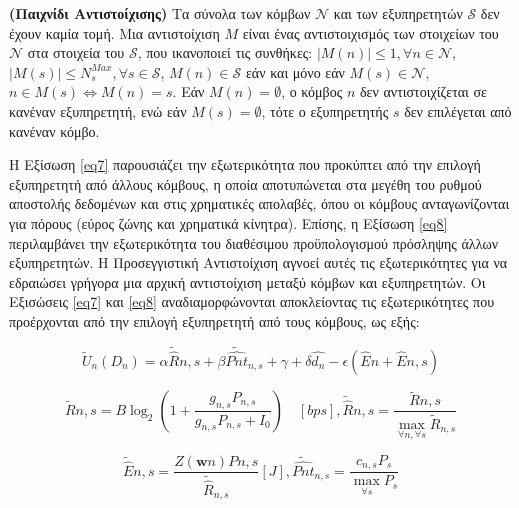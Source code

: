 \begin{definition} \label{Definition 1} \textbf{(Παιχνίδι Αντιστοίχισης)} Τα σύνολα των κόμβων $\mathcal{N}$ και των εξυπηρετητών $\mathcal{S}$ δεν έχουν καμία τομή. Μια αντιστοίχιση $M$ είναι ένας αντιστοιχισμός των στοιχείων του $\mathcal{N}$ στα στοιχεία του $\mathcal{S}$, που ικανοποιεί τις συνθήκες: $|M(n)| \leq 1, \forall n \in \mathcal{N}$, $|M(s)| \leq N_s^{Max}, \forall s \in \mathcal{S}$, $M(n) \in \mathcal{S}$ εάν και μόνο εάν $M(s) \in \mathcal{N}$, $n \in M(s) \Leftrightarrow M(n) = s$. Εάν $M(n) = \emptyset$, ο κόμβος $n$ δεν αντιστοιχίζεται σε κανέναν εξυπηρετητή, ενώ εάν $M(s) = \emptyset$, τότε ο εξυπηρετητής $s$ δεν επιλέγεται από κανέναν κόμβο.

\end{definition}

Η Εξίσωση \ref{eq7} παρουσιάζει την εξωτερικότητα που προκύπτει από την επιλογή εξυπηρετητή από άλλους κόμβους, η οποία αποτυπώνεται στα μεγέθη του ρυθμού αποστολής δεδομένων και στις χρηματικές απολαβές, όπου οι κόμβους ανταγωνίζονται για πόρους (εύρος ζώνης και χρηματικά κίνητρα). Επίσης, η Εξίσωση \ref{eq8} περιλαμβάνει την εξωτερικότητα του διαθέσιμου προϋπολογισμού πρόσληψης άλλων εξυπηρετητών. Η Προσεγγιστική Αντιστοίχιση αγνοεί αυτές τις εξωτερικότητες για να εδραιώσει γρήγορα μια αρχική αντιστοίχιση μεταξύ κόμβων και εξυπηρετητών. Οι Εξισώσεις \ref{eq7} και \ref{eq8} αναδιαμορφώνονται αποκλείοντας τις εξωτερικότητες που προέρχονται από την επιλογή εξυπηρετητή από τους κόμβους, ως εξής:

\vspace{-8pt}

\begin{equation}
\widetilde{U}_n(D_n)=\alpha \widetilde{\hat{R}}{n,s} + \beta \widetilde{\hat{Pnt}}_{n,s} +\gamma + \delta \hat{d_n} -\epsilon (\hat{E}n+\hat{E}{n,s})
\label{eq9}
\end{equation}

\vspace{-8pt}

\[\widetilde{R}{n,s} = B \log_2(1 + \frac{g_{n,s} P_{n,s}}{g_{n,s} P_{n,s} + I_0}) \quad [bps], \widetilde{\hat{R}}{n,s} = \frac{\widetilde{R}{n,s}}{\max \limits_{\forall n, \forall s} { \widetilde{R}_{n,s} }}\]

\[\widetilde{\hat{E}}{n,s} = \frac{Z(\mathbf{w}n)P{n,s}}{\widetilde{\hat{R}}_{n,s}}[J], \widetilde{\hat{Pnt}}_{n,s} = \frac{c_{n,s}P_s}{\max \limits_{\forall s} P_s}\]

\vspace{-5pt}


